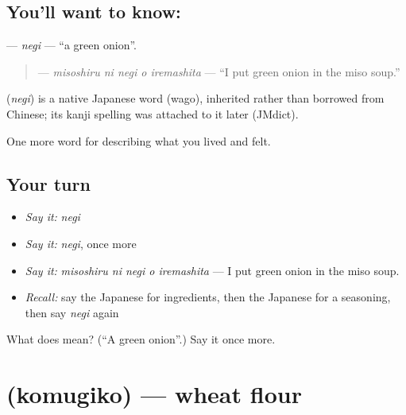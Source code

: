 \subsection*{You'll want to know: }
\textbf{} — \emph{negi} — \textquotedblleft{}a green onion\textquotedblright{}.

\begin{quote}
\textbf{  } — \emph{misoshiru ni negi o iremashita} — \textquotedblleft{}I put green onion in the miso soup.\textquotedblright{}
\end{quote}

\begin{cousinweb}
\textbf{} (\emph{negi}) is a native Japanese word (wago), inherited rather than borrowed from Chinese; its kanji spelling was attached to it later (JMdict).
\end{cousinweb}

\begin{grammarlens}[title={What you've built}]
One more word for describing what you lived and felt.
\end{grammarlens}

\subsection*{Your turn}
\begin{itemize}
\raggedright
  \item \emph{Say it:} \emph{negi}
  \item \emph{Say it:} \emph{negi}, once more
  \item \emph{Say it:} \emph{misoshiru ni negi o iremashita} — I put green onion in the miso soup.
  \item \emph{Recall:} say the Japanese for ingredients, then the Japanese for a seasoning, then say \emph{negi} again
\end{itemize}

\begin{tcolorbox}[breakable,colback=teal!4,colframe=teal!35!black,title={Before you move on}]
What does  mean? (\textquotedblleft{}A green onion\textquotedblright{}.) Say it once more.
\end{tcolorbox}
\section[\texorpdfstring{\ja{こむぎこ} (komugiko)}{こむぎこ (komugiko)}]{ (komugiko) — wheat flour}

